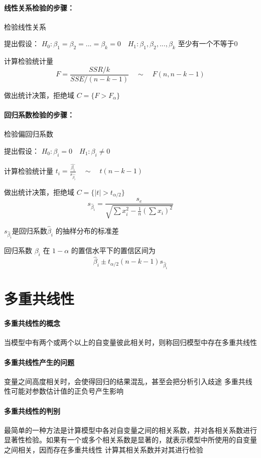 \documentclass[UTF8,10pt]{book}
\begin{document}
\paragraph{线性关系检验的步骤：}	检验线性关系

提出假设： $ H_0 : \beta_1 = \beta_2 = ... = \beta_k = 0 \quad H_1 : \beta_1 , \beta_2 , ... , \beta_k$ 至少有一个不等于0 

计算检验统计量 
$$ F = \frac{SSR/k}{SSE/(n-k-1)} \quad \sim \quad F(n,n-k-1) $$ 

做出统计决策，拒绝域 $ C = \{ F>F_{\alpha} \} $

\paragraph{回归系数检验的步骤：}	检验偏回归系数

提出假设： $ H_0 : \beta_i = 0 \quad H_1 : \beta_i \neq 0$ 

计算检验统计量 $t_i = \frac{\hat{\beta_i}}{s_{\hat{\beta_i}}} \quad \sim \quad t(n-k-1)$ 

做出统计决策，拒绝域 $ C = \{ |t|>t_{\alpha / 2} \} $ 
$$ s_{\hat{\beta}_i} = \frac{s_e}{\sqrt{\sum x_i^2 - \frac{1}{n}\left(\sum x_i\right)^2}} $$ 

$ s_{\hat{\beta}_i} $是回归系数$\hat{\beta}_i$ 的抽样分布的标准差

回归系数 $\beta_i$ 在 $1-\alpha$ 的置信水平下的置信区间为	
$$ \hat{\beta}_i \pm t_{\alpha /2}(n-k-1)s_{\hat{\beta}_i} $$

\section{多重共线性}
\paragraph{多重共线性的概念}	当模型中有两个或两个以上的自变量彼此相关时，则称回归模型中存在多重共线性

\paragraph{多重共线性产生的问题}	变量之间高度相关时，会使得回归的结果混乱，甚至会把分析引入歧途 多重共线性可能对参数估计值的正负号产生影响

\paragraph{多重共线性的判别}	最简单的一种方法是计算模型中各对自变量之间的相关系数，并对各相关系数进行显著性检验。如果有一个或多个相关系数是显著的，就表示模型中所使用的自变量之间相关，因而存在多重共线性 计算其相关系数并对其进行检验
\end{document}
